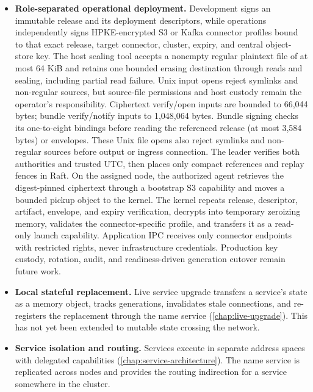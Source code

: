 \begin{itemize}
    \item \textbf{Role-separated operational deployment.} Development signs
        an immutable release and its deployment descriptors, while operations
        independently signs HPKE-encrypted S3 or Kafka connector profiles bound
        to that exact release, target connector, cluster, expiry, and central
        object-store key. The host sealing tool accepts a nonempty regular
        plaintext file of at most 64 KiB and retains one bounded erasing
        destination through reads and sealing, including partial read failure.
        Unix input opens reject symlinks and non-regular sources, but source-file
        permissions and host custody remain the operator's responsibility.
        Ciphertext verify/open inputs are bounded to 66,044 bytes; bundle
        verify/notify inputs to 1,048,064 bytes. Bundle signing checks its
        one-to-eight bindings before reading the referenced release (at most
        3,584 bytes) or envelopes. These Unix file opens also reject symlinks
        and non-regular sources before output or ingress connection.
        The leader verifies both authorities and trusted UTC,
        then places only compact references and replay fences in Raft. On the
        assigned node, the authorized agent retrieves the digest-pinned
        ciphertext through a bootstrap S3 capability and moves a bounded pickup
        object to the kernel. The kernel repeats release, descriptor, artifact,
        envelope, and expiry verification, decrypts into temporary zeroizing
        memory, validates the connector-specific profile, and transfers it as a
        read-only launch capability. Application IPC receives only
        connector endpoints with restricted rights, never infrastructure credentials. Production key
        custody, rotation, audit, and readiness-driven generation cutover remain
        future work.

    \item \textbf{Local stateful replacement.} Live service upgrade
        transfers a service's state as a memory object, tracks generations,
        invalidates stale connections, and re-registers the replacement
        through the name service (\autoref{chap:live-upgrade}). This has not yet been
        extended to mutable state crossing the network.

    \item \textbf{Service isolation and routing.} Services execute in
        separate address spaces with delegated capabilities
        (\autoref{chap:service-architecture}).
        The name service is replicated across nodes and provides the routing
        indirection for a service somewhere in the cluster.


\end{itemize}
